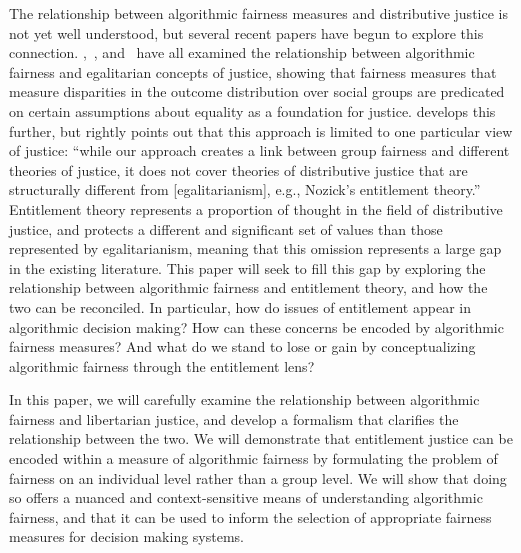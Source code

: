 The relationship between algorithmic fairness measures and distributive justice
is not yet well understood, but several recent papers have begun to explore this
connection. \cite{Binns_2018},~\cite{Hertweck_2024}, and~\cite{Kuppler_2021}
have all examined the relationship between algorithmic fairness and egalitarian
concepts of justice, showing that fairness measures that measure disparities in
the outcome distribution over social groups are predicated on certain
assumptions about equality as a foundation for justice. \cite{Baumann_2023} 
develops this further, but rightly points out that this approach is limited to
one particular view of justice: ``while our approach creates a link between
group fairness and different theories of justice, it does not cover theories of
distributive justice that are structurally different from [egalitarianism],
e.g., Nozick's entitlement theory.'' Entitlement theory represents a proportion
of thought in the field of distributive justice, and protects a different and
significant set of values than those represented by egalitarianism, meaning that
this omission represents a large gap in the existing literature. This paper will
seek to fill this gap by exploring the relationship between algorithmic fairness
and entitlement theory, and how the two can be reconciled. In particular, how do
issues of entitlement appear in algorithmic decision making? How can these
concerns be encoded by algorithmic fairness measures? And what do we stand to
lose or gain by conceptualizing algorithmic fairness through the entitlement
lens?

In this paper, we will carefully examine the relationship between algorithmic
fairness and libertarian justice, and develop a formalism that clarifies the
relationship between the two. We will demonstrate that entitlement justice can
be encoded within a measure of algorithmic fairness by formulating the problem
of fairness on an individual level rather than a group level. We will show that
doing so offers a nuanced and context-sensitive means of understanding
algorithmic fairness, and that it can be used to inform the selection of
appropriate fairness measures for decision making systems.

